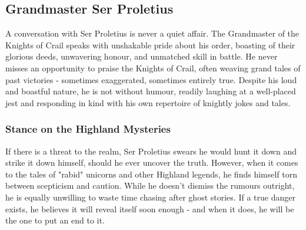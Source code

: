 \subsection*{Grandmaster Ser Proletius}
{\entryfont A conversation with Ser Proletius is never a quiet affair. The Grandmaster of the Knights of Crail speaks with unshakable pride about his order, boasting of their glorious deeds, unwavering honour, and unmatched skill in battle. He never misses an opportunity to praise the Knights of Crail, often weaving grand tales of past victories - sometimes exaggerated, sometimes entirely true. Despite his loud and boastful nature, he is not without humour, readily laughing at a well-placed jest and responding in kind with his own repertoire of knightly jokes and tales.}
\subsubsection*{Stance on the Highland Mysteries}
{\entryfont If there is a threat to the realm, Ser Proletius swears he would hunt it down and strike it down himself, should he ever uncover the truth. However, when it comes to the tales of "rabid" unicorns and other Highland legends, he finds himself torn between scepticism and caution. While he doesn't dismiss the rumours outright, he is equally unwilling to waste time chasing after ghost stories. If a true danger exists, he believes it will reveal itself soon enough - and when it does, he will be the one to put an end to it.}